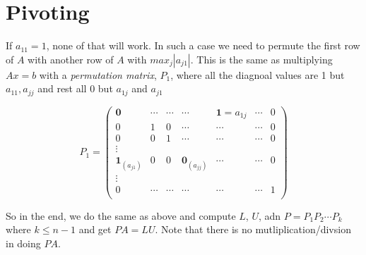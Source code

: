 \section{Pivoting}
If $a_{11} = 1$, none of that will work. In such a case we need to
permute the first row of $A$ with another row of $A$ with
$max_j|a_{j1}|$.
This is the same as multiplying $Ax=b$ with a \emph{permutation
  matrix}, $P_1$, where all the diagnoal values are 1 but $a_{11},
a_{jj}$ and rest all 0 but $a_{1j}$ and $a_{j1}$

$$P_1 = 
\begin{pmatrix}
  \mathbf{0} &  \cdots &  \cdots & \cdots &\mathbf{1}=a_{1j} & \cdots & 0\\
0 & 1 & 0& \cdots & \cdots & \cdots &  0\\
0 & 0 & 1 &\cdots & \cdots & \cdots &  0\\
\vdots\\
\mathbf{1}_{(a_{j1})} & 0 & 0 & \mathbf{0}_{(a_{jj})} & \cdots & \cdots &  0\\
\vdots\\
0 &  \cdots  & \cdots &\cdots &\cdots &   \cdots &    1\\
\end{pmatrix}
$$

So in the end, we do the same as above and compute $L$, $U$, adn
$P=P_1P_2\cdots P_{k}$ where $k\le n-1$ and get $PA=LU$. Note that there is no
mutliplication/divsion in doing $PA$.

